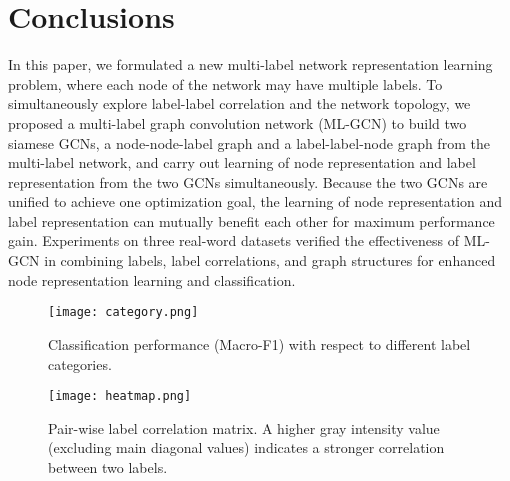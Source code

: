 \documentclass[conference]{IEEEtran}
\begin{document}
\section{Conclusions} 
In this paper, we formulated a new multi-label network representation learning problem, where each node of the network may have multiple labels. To simultaneously explore label-label correlation and the network topology, we proposed a multi-label graph convolution network (ML-GCN) to build two siamese GCNs, a node-node-label graph and a label-label-node graph from the multi-label network, and carry out learning of node representation and label representation from the two GCNs simultaneously. Because the two GCNs are unified to achieve one optimization goal, the learning of node representation and label representation can mutually benefit each other for maximum performance gain. Experiments on three real-word datasets verified the effectiveness of ML-GCN in combining labels, label correlations, and graph structures for enhanced node representation learning and classification. 

\begin{figure}[t]
\centering
\begin{minipage}[b]{0.59\linewidth}
\centering 
\texttt{[image: category.png]}
\end{minipage}\caption{Classification performance (Macro-F1) with respect to different label categories.}
\label{fig:5}
\end{figure}

\begin{figure}[t]
\centering
\begin{minipage}[b]{0.59\linewidth}
\centering 
\texttt{[image: heatmap.png]}
\end{minipage}\caption{Pair-wise label correlation matrix. A higher gray intensity value (excluding main diagonal values) indicates a stronger correlation between two labels.}
\label{fig:5}
\end{figure}










\end{document}
